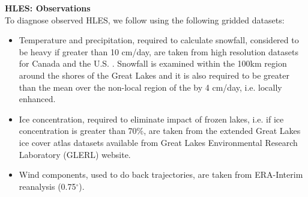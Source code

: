 \documentclass[a0b,landscape]{a0poster}
\begin{document}
\begin{multicols*}{4}
\vspace{0.5cm}
\noindent
{}

\vspace{0.5cm}
\noindent
\textbf{HLES: Observations}\\
To diagnose observed HLES, we follow \citet{notaro2015} using the following gridded datasets:
    \begin{itemize}
        \item Temperature and precipitation, required to calculate snowfall, considered
              to be heavy if greater than 10 cm/day, are taken from high resolution datasets
              for Canada  \citep[10km, ][]{hopkinson2011} and the U.S. \citep[0.125$^\circ$, ][]{maurer2002}. Snowfall is examined within the 100km region around the shores of the Great Lakes and it is also
              required to be greater than the mean over the non-local region of the  by 4 cm/day, i.e. locally enhanced.
        \item Ice concentration, required to eliminate impact of frozen lakes, i.e. if ice
              concentration is greater than 70\%, are taken from the extended Great Lakes ice
              cover atlas datasets available from Great Lakes Environmental Research
              Laboratory (GLERL) website.
        \item Wind components, used to do back trajectories, are taken from ERA-Interim reanalysis (0.75$^\circ$).
    \end{itemize}


\end{multicols*}
\end{document}
